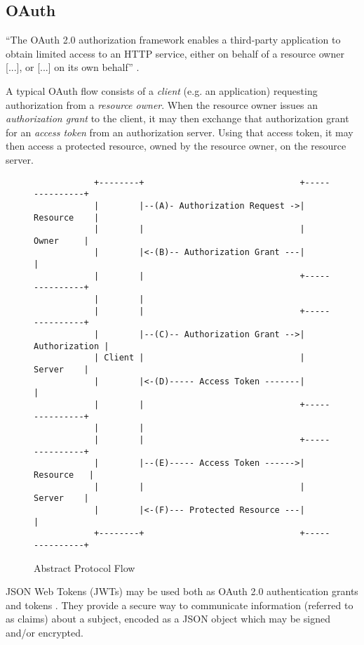 \subsection{OAuth}
``The OAuth 2.0 authorization framework enables a third-party
application to obtain limited access to an HTTP service, either on
behalf of a resource owner [...], or [...] on its own behalf'' \autocite{Hardt2023}.

A typical OAuth flow consists of a \emph{client} (e.g. an application) requesting authorization from a \emph{resource owner}. When the resource owner issues an \emph{authorization grant} to the client, it may then exchange that authorization grant for an \emph{access token} from an authorization server. Using that access token, it may then access a protected resource, owned by the resource owner, on the resource server. \autocite{Hardt2023}
\begin{figure}[h]
    \begin{scriptsize}
        \begin{verbatim} 
            +--------+                               +---------------+
            |        |--(A)- Authorization Request ->|   Resource    |
            |        |                               |     Owner     |
            |        |<-(B)-- Authorization Grant ---|               |
            |        |                               +---------------+
            |        |
            |        |                               +---------------+
            |        |--(C)-- Authorization Grant -->| Authorization |
            | Client |                               |     Server    |
            |        |<-(D)----- Access Token -------|               |
            |        |                               +---------------+
            |        |
            |        |                               +---------------+
            |        |--(E)----- Access Token ------>|    Resource   |
            |        |                               |     Server    |
            |        |<-(F)--- Protected Resource ---|               |
            +--------+                               +---------------+
        \end{verbatim}
    \end{scriptsize}
    \caption{Abstract Protocol Flow \autocite{Hardt2023}}
\end{figure}

JSON Web Tokens (JWTs) may be used both as OAuth 2.0 authentication grants and tokens \autocite{Jones2015a, Bertocci2021}. They provide a secure way to communicate information (referred to as claims) about a subject, encoded as a JSON object which may be signed and/or encrypted. \autocite{Jones2015}

